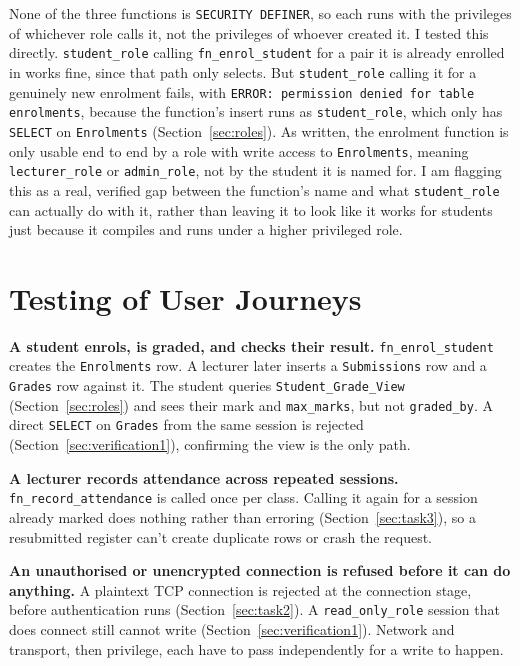 \documentclass[12pt,a4paper]{article}
\begin{document}
None of the three functions is \lstinline|SECURITY DEFINER|, so each runs with the privileges of whichever role calls it, not the privileges of whoever created it. I tested this directly. \lstinline|student_role| calling \lstinline|fn_enrol_student| for a pair it is already enrolled in works fine, since that path only selects. But \lstinline|student_role| calling it for a genuinely new enrolment fails, with \lstinline|ERROR: permission denied for table enrolments|, because the function's insert runs as \lstinline|student_role|, which only has \lstinline|SELECT| on \lstinline|Enrolments| (Section~\ref{sec:roles}). As written, the enrolment function is only usable end to end by a role with write access to \lstinline|Enrolments|, meaning \lstinline|lecturer_role| or \lstinline|admin_role|, not by the student it is named for. I am flagging this as a real, verified gap between the function's name and what \lstinline|student_role| can actually do with it, rather than leaving it to look like it works for students just because it compiles and runs under a higher privileged role.

\newpage
\section{Testing of User Journeys}
\label{sec:testing}

\noindent\textbf{A student enrols, is graded, and checks their result.} \lstinline|fn_enrol_student| creates the \lstinline|Enrolments| row. A lecturer later inserts a \lstinline|Submissions| row and a \lstinline|Grades| row against it. The student queries \lstinline|Student_Grade_View| (Section~\ref{sec:roles}) and sees their mark and \lstinline|max_marks|, but not \lstinline|graded_by|. A direct \lstinline|SELECT| on \lstinline|Grades| from the same session is rejected (Section~\ref{sec:verification1}), confirming the view is the only path.

\noindent\textbf{A lecturer records attendance across repeated sessions.} \lstinline|fn_record_attendance| is called once per class. Calling it again for a session already marked does nothing rather than erroring (Section~\ref{sec:task3}), so a resubmitted register can't create duplicate rows or crash the request.

\noindent\textbf{An unauthorised or unencrypted connection is refused before it can do anything.} A plaintext TCP connection is rejected at the connection stage, before authentication runs (Section~\ref{sec:task2}). A \lstinline|read_only_role| session that does connect still cannot write (Section~\ref{sec:verification1}). Network and transport, then privilege, each have to pass independently for a write to happen.
\end{document}
